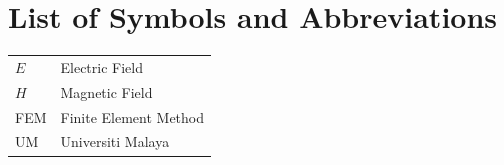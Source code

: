 \chapter*{List of Symbols and Abbreviations}

\begin{tabular}{l l}
    $E$ & Electric Field \\
    $H$ & Magnetic Field \\
    FEM & Finite Element Method \\
    UM & Universiti Malaya \\
\end{tabular}